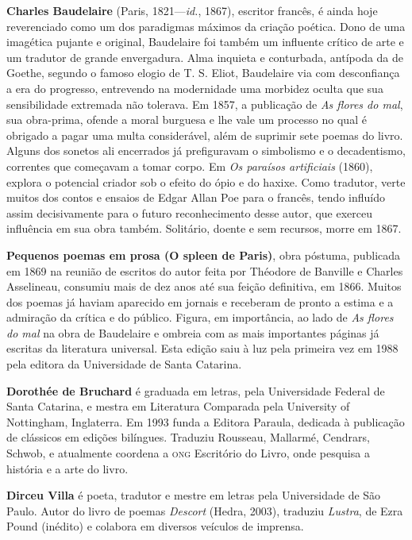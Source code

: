 \textbf{Charles Baudelaire} (Paris, 1821---\textit{id.}, 1867), escritor francês, é
 ainda hoje reverenciado como um dos paradigmas máximos da criação poética.
 Dono de uma imagética pujante e original, Baudelaire foi também um
 influente crítico de arte e um tradutor de grande envergadura. Alma
 inquieta e conturbada, antípoda da de Goethe, segundo o famoso elogio de
 T. S. Eliot, Baudelaire via com desconfiança a era do progresso,
 entrevendo na modernidade uma morbidez oculta que sua sensibilidade
 extremada não tolerava. Em 1857, a publicação de \textit{As flores do mal}, sua
 obra-prima, ofende a moral burguesa e lhe vale um processo no qual é
 obrigado a pagar uma multa considerável, além de suprimir sete poemas do livro.
 Alguns dos sonetos ali encerrados
 já prefiguravam o simbolismo e o decadentismo, correntes que começavam a
 tomar corpo. Em \textit{Os paraísos artificiais} (1860), explora o potencial
 criador sob o efeito do ópio e do haxixe. Como tradutor, verte
 muitos dos contos e ensaios de  Edgar Allan Poe para o francês, tendo influído assim decisivamente
 para o futuro reconhecimento desse autor, que 
 exerceu influência em sua obra também. Solitário, doente e sem recursos,
 morre em 1867.

\textbf{Pequenos poemas em prosa (O spleen de Paris)}, obra póstuma, publicada em 1869 na reunião
 de escritos do autor feita por Théodore de Banville e Charles Asselineau,
 consumiu mais de dez anos até sua feição definitiva, em 1866. Muitos dos poemas
 já haviam aparecido em jornais e receberam de pronto a estima e a
 admiração da crítica e do público. Figura, em importância, ao lado de
 \textit{As flores do mal} na obra de Baudelaire e ombreia com
 as mais importantes páginas já escritas da literatura universal. Esta edição
saiu à luz pela primeira vez em 1988 pela editora da Universidade de Santa Catarina.

\textbf{Dorothée de Bruchard} é graduada em letras, pela Universidade Federal
 de Santa Catarina, e mestra em Literatura Comparada pela University of
 Nottingham, Inglaterra. Em 1993 funda a Editora Paraula, dedicada à
 publicação de clássicos em edições bilíngues. Traduziu Rousseau, Mallarmé,
 Cendrars, Schwob, e atualmente coordena a \textsc{ong} Escritório do Livro, onde
 pesquisa a história e a arte do livro.

\textbf{Dirceu Villa} é poeta, tradutor e mestre em letras pela Universidade
 de São Paulo. Autor do livro de poemas \textit{Descort} (Hedra, 2003), traduziu
 \textit{Lustra}, de Ezra Pound (inédito) e colabora em diversos veículos de imprensa.


